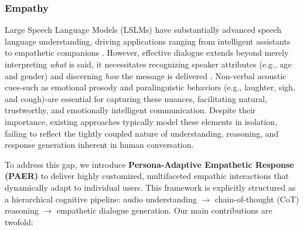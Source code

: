 \subsubsection{Empathy}


Large Speech Language Models (LSLMs) have substantially advanced speech language understanding, driving applications ranging from intelligent assistants to empathetic companions \cite{DBLP:conf/naacl/WangZLSLZLAC25}. However, effective dialogue extends beyond merely interpreting \textit{what} is said, it necessitates recognizing speaker attributes (e.g., age and gender) and discerning \textit{how} the message is delivered \cite{DBLP:conf/iclr/ChengHYLF0J0Z0025, DBLP:conf/emnlp/YanLCNYMYC25}. Non-verbal acoustic cues-such as emotional prosody and paralinguistic behaviors (e.g., laughter, sigh, and cough)-are essential for capturing these nuances, facilitating natural, trustworthy, and emotionally intelligent communication. Despite their importance, existing approaches typically model these elements in isolation, failing to reflect the tightly coupled nature of understanding, reasoning, and response generation inherent in human conversation.

To address this gap, we introduce \textbf{Persona-Adaptive Empathetic Response (PAER)} to deliver highly customized, multifaceted empathic interactions that dynamically adapt to individual users. This framework is explicitly structured as a hierarchical cognitive pipeline: audio understanding $\rightarrow$ chain-of-thought (CoT) reasoning $\rightarrow$ empathetic dialogue generation. Our main contributions are twofold:

